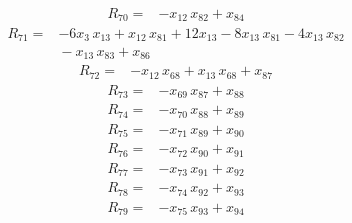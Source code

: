 \documentclass[11pt]{article}
\begin{document}
\begin{equation*}\begin{aligned}
R_{70}={}&-x_{12}\,x_{82} + x_{84}
\end{aligned}\end{equation*}
\begin{equation*}\begin{aligned}
R_{71}={}&-6x_{3}\,x_{13} + x_{12}\,x_{81} + 12x_{13} - 8x_{13}\,x_{81} - 4x_{13}\,x_{82} \\
&{} - x_{13}\,x_{83} + x_{86}
\end{aligned}\end{equation*}
\begin{equation*}\begin{aligned}
R_{72}={}&-x_{12}\,x_{68} + x_{13}\,x_{68} + x_{87}
\end{aligned}\end{equation*}
\begin{equation*}\begin{aligned}
R_{73}={}&-x_{69}\,x_{87} + x_{88}
\end{aligned}\end{equation*}
\begin{equation*}\begin{aligned}
R_{74}={}&-x_{70}\,x_{88} + x_{89}
\end{aligned}\end{equation*}
\begin{equation*}\begin{aligned}
R_{75}={}&-x_{71}\,x_{89} + x_{90}
\end{aligned}\end{equation*}
\begin{equation*}\begin{aligned}
R_{76}={}&-x_{72}\,x_{90} + x_{91}
\end{aligned}\end{equation*}
\begin{equation*}\begin{aligned}
R_{77}={}&-x_{73}\,x_{91} + x_{92}
\end{aligned}\end{equation*}
\begin{equation*}\begin{aligned}
R_{78}={}&-x_{74}\,x_{92} + x_{93}
\end{aligned}\end{equation*}
\begin{equation*}\begin{aligned}
R_{79}={}&-x_{75}\,x_{93} + x_{94}
\end{aligned}\end{equation*}
\end{document}
